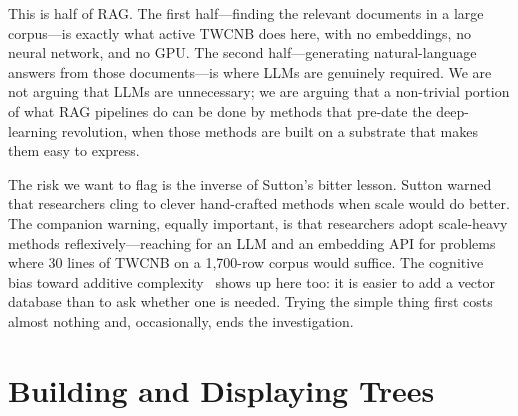 This is half of RAG. The first half---finding the relevant
documents in a large corpus---is exactly what active TWCNB
does here, with no embeddings, no neural network, and no
GPU. The second half---generating natural-language answers
from those documents---is where LLMs are genuinely required.
We are not arguing that LLMs are unnecessary; we are arguing
that a non-trivial portion of what RAG pipelines do can be
done by methods that pre-date the deep-learning revolution,
when those methods are built on a substrate that makes them
easy to express.

The risk we want to flag is the inverse of Sutton's bitter
lesson. Sutton warned that researchers cling to clever
hand-crafted methods when scale would do better. The
companion warning, equally important, is that researchers
adopt scale-heavy methods reflexively---reaching for an LLM
and an embedding API for problems where 30 lines of TWCNB
on a 1{,}700-row corpus would suffice. The cognitive bias
toward additive complexity~\cite{Fillon25,adams2021people}
shows up here too: it is easier to add a vector database
than to ask whether one is needed. Trying the simple thing
first costs almost nothing and, occasionally, ends the
investigation.

\appendix
\section*{Building and Displaying Trees}



